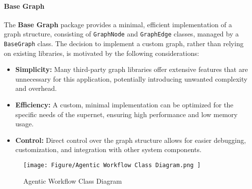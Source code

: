 \documentclass[../Main.tex]{subfiles}
\begin{document}
	\paragraph{Base Graph}
	The \textbf{Base Graph} package provides a minimal, efficient implementation of
	a graph structure, consisting of \texttt{GraphNode} and \texttt{GraphEdge}
	classes, managed by a \texttt{BaseGraph} class. The decision to implement a custom
	graph, rather than relying on existing libraries, is motivated by the following
	considerations:
	\begin{itemize}
		\item \textbf{Simplicity:} Many third-party graph libraries offer extensive
			features that are unnecessary for this application, potentially introducing
			unwanted complexity and overhead.

		\item \textbf{Efficiency:} A custom, minimal implementation can be optimized
			for the specific needs of the supernet, ensuring high performance and low
			memory usage.

		\item \textbf{Control:} Direct control over the graph structure allows for
			easier debugging, customization, and integration with other system
			components.
	\end{itemize}

	\begin{figure}[H]
		\centering
		\texttt{[image: 
			Figure/Agentic Workflow Class Diagram.png
		]}
		\caption{Agentic Workflow Class Diagram}
		\label{fig:Agentic_Workflow_Class_Diagram}
	\end{figure}
\end{document}
